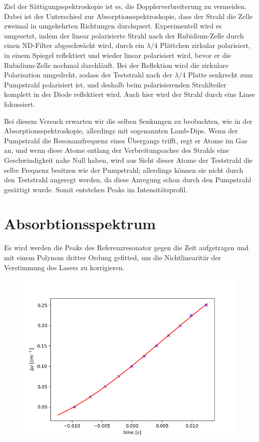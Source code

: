 \documentclass[a4paper,parskip]{scrartcl}
\begin{document}
Ziel der Sättigungsspektroskopie ist es, die Dopplerverbreiterung zu vermeiden. Dabei ist der Unterschied zur Absorptionsspektroskopie, dass der Strahl die Zelle zweimal in umgekehrten Richtungen durchquert. Experimentell wird es umgesetzt, indem der linear polarisierte Strahl nach der Rubidium-Zelle durch einen ND-Filter abgeschwächt wird, durch ein $\lambda/4$ Plättchen zirkular polarisiert, in einem Spiegel reflektiert und wieder linear polarisiert wird, bevor er die Rubidium-Zelle nochmal durchläuft. Bei der Reflektion wird die zirkulare Polarisation umgedreht, sodass der Teststrahl nach der $\lambda/4$ Platte senkrecht zum Pumpstrahl polarisiert ist, und deshalb beim polarisierenden Strahlteiler komplett in der Diode reflektiert wird. Auch hier wird der Strahl durch eine Linse fokussiert.

Bei diesem Versuch erwarten wir die selben Senkungen zu beobachten, wie in der Absorptionsspektroskopie, allerdings mit sogenannten Lamb-Dips. Wenn der Pumpstrahl die Resonanzfrequenz eines Übergangs trifft, regt er Atome im Gas an, und wenn diese Atome entlang der Verbreitungsachse des Strahls eine Geschwindigkeit nahe Null haben, wird aus Sicht dieser Atome der Teststrahl die selbe Frequenz besitzen wie der Pumpstrahl; allerdings können sie nicht durch den Teststrahl angeregt werden, da diese Anregung schon durch den Pumpstrahl gesättigt wurde. Somit entstehen Peaks im Intensitätsprofil.

\section{Absorbtionsspektrum}

Es wird werden die Peaks des Referenzresonator gegen die Zeit aufgetragen und mit einem Polynom dritter Ordung gefitted, um die Nichtlinearitär der Verstimmung des Lasers zu korrigieren.

\begin{figure}[h]
\includegraphics[scale = 0.5]{./absorbtion/frequencyCorrection}
\end{figure}
\end{document}
